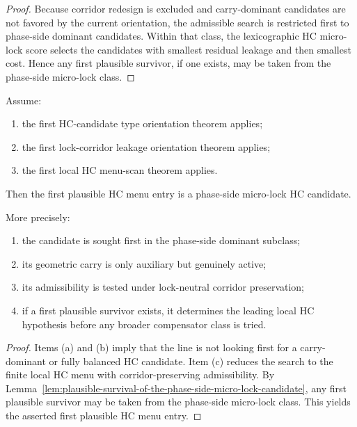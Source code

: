\begin{proof}
Because corridor redesign is excluded and carry-dominant candidates are not favored by the current orientation, the admissible search is restricted first to phase-side dominant candidates. Within that class, the lexicographic HC micro-lock score selects the candidates with smallest residual leakage and then smallest cost. Hence any first plausible survivor, if one exists, may be taken from the phase-side micro-lock class.
\end{proof}

\begin{theorem}
\label{thm:first-plausible-hc-menu-entry-theorem}
Assume:
\begin{enumerate}[leftmargin=2em,label=(\alph*)]
  \item the first HC-candidate type orientation theorem applies;
  \item the first lock-corridor leakage orientation theorem applies;
  \item the first local HC menu-scan theorem applies.
\end{enumerate}
Then the first plausible HC menu entry is a phase-side micro-lock HC candidate.

More precisely:
\begin{enumerate}[leftmargin=2em,label=(\roman*)]
  \item the candidate is sought first in the phase-side dominant subclass;
  \item its geometric carry is only auxiliary but genuinely active;
  \item its admissibility is tested under lock-neutral corridor preservation;
  \item if a first plausible survivor exists, it determines the leading local HC hypothesis before any broader compensator class is tried.
\end{enumerate}
\end{theorem}

\begin{proof}
Items (a) and (b) imply that the line is not looking first for a carry-dominant or fully balanced HC candidate. Item (c) reduces the search to the finite local HC menu with corridor-preserving admissibility. By Lemma~\ref{lem:plausible-survival-of-the-phase-side-micro-lock-candidate}, any first plausible survivor may be taken from the phase-side micro-lock class. This yields the asserted first plausible HC menu entry.
\end{proof}

